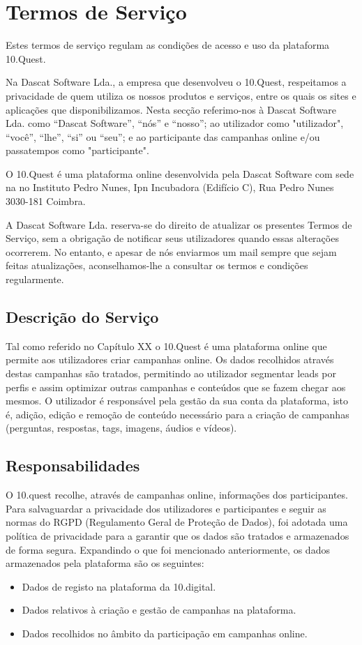 \chapter{Termos de Serviço}
\label{sec:gdpr}

Estes termos de serviço regulam as condições de acesso e uso da plataforma 10.Quest. 

Na Dascat Software Lda., a empresa que desenvolveu o 10.Quest, respeitamos a privacidade de quem utiliza os nossos produtos e serviços, entre os quais os sites e aplicações que disponibilizamos. Nesta secção referimo-nos à Dascat Software Lda. como “Dascat Software”, “nós” e “nosso”; ao utilizador como "utilizador", “você”, “lhe”, “si” ou “seu”; e ao participante das campanhas online e/ou passatempos como "participante".

O 10.Quest é uma plataforma online desenvolvida pela Dascat Software com sede na no Instituto Pedro Nunes, Ipn Incubadora (Edifício C), Rua Pedro Nunes 3030-181 Coimbra.

A Dascat Software Lda. reserva-se do direito de atualizar os presentes Termos de Serviço, sem a obrigação de notificar seus utilizadores quando essas alterações ocorrerem. No entanto, e apesar de nós enviarmos um mail sempre que sejam feitas atualizações, aconselhamos-lhe a consultar os termos e condições regularmente.

\section{Descrição do Serviço}

Tal como referido no Capítulo XX o 10.Quest é uma plataforma online que permite aos utilizadores criar campanhas online. Os dados recolhidos através destas campanhas são tratados, permitindo ao utilizador segmentar leads por perfis e assim optimizar outras campanhas e conteúdos que se fazem chegar aos mesmos.
O utilizador é responsável pela gestão da sua conta da plataforma, isto é, adição, edição e remoção de conteúdo necessário para a criação de campanhas (perguntas, respostas, tags, imagens, áudios e vídeos).

\section{Responsabilidades}

O 10.quest recolhe, através de campanhas online, informações dos participantes. Para salvaguardar a privacidade dos utilizadores e participantes e seguir as normas do RGPD (Regulamento Geral de Proteção de Dados)\cite{f10}, foi adotada uma política de privacidade para a garantir que os dados são tratados e armazenados de forma segura.
Expandindo o que foi mencionado anteriormente, os dados armazenados pela plataforma são os seguintes:
\begin{itemize}
	\item Dados de registo na plataforma da 10.digital.
	\item Dados relativos à criação e gestão de campanhas na plataforma.
	\item Dados recolhidos no âmbito da participação em campanhas online.
\end{itemize}

